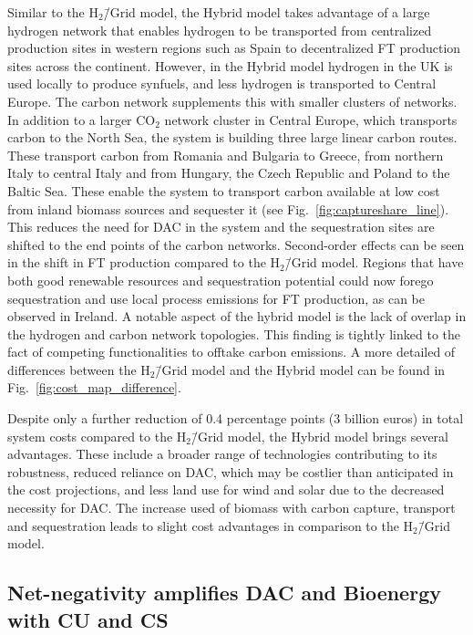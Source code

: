 \documentclass[twocolumn]{article}
\newcommand{\COtwo}{CO$_2$}
\newcommand{\modH}{H$_2$\=/Grid model}
\newcommand{\modHybrid}{Hybrid model}
\begin{document}
Similar to the \modH{}, the \modHybrid{} takes advantage of a large hydrogen network that enables hydrogen to be transported from centralized production sites in western regions such as Spain to decentralized FT production sites across the continent. However, in the \modHybrid{} hydrogen in the UK is used locally to produce synfuels, and less hydrogen is transported to Central Europe.
The carbon network supplements this with smaller clusters of networks. In addition to a larger \COtwo{} network cluster in Central Europe, which transports carbon to the North Sea, the system is building three large linear carbon routes. These transport carbon from Romania and Bulgaria to Greece, from northern Italy to central Italy and from Hungary, the Czech Republic and Poland to the Baltic Sea. These enable the system to transport carbon available at low cost from inland biomass sources and sequester it (see Fig.~\ref{fig:captureshare_line}). This reduces the need for DAC in the system and the sequestration sites are shifted to the end points of the carbon networks. Second-order effects can be seen in the shift in FT production compared to the \modH{}. Regions that have both good renewable resources and sequestration potential could now forego sequestration and use local process emissions for FT production, as can be observed in Ireland. A notable aspect of the hybrid model is the lack of overlap in the hydrogen and carbon network topologies. This finding is tightly linked to the fact of competing functionalities to offtake carbon emissions.
A more detailed of differences between the \modH{} and the \modHybrid{} can be found in Fig.~\ref{fig:cost_map_difference}.


Despite only a further reduction of \label{}0.4 percentage points (\label{}3 billion euros) in total system costs compared to the \modH{}, the \modHybrid{} brings several advantages. These include a broader range of technologies contributing to its robustness, reduced reliance on DAC, which may be costlier than anticipated in the cost projections, and less land use for wind and solar due to the decreased necessity for DAC. The increase used of biomass with carbon capture, transport and sequestration leads to slight cost advantages in comparison to the \modH{}.



\subsection*{Net-negativity amplifies DAC and Bioenergy with CU and CS}\label{subsec:NN}
\end{document}
